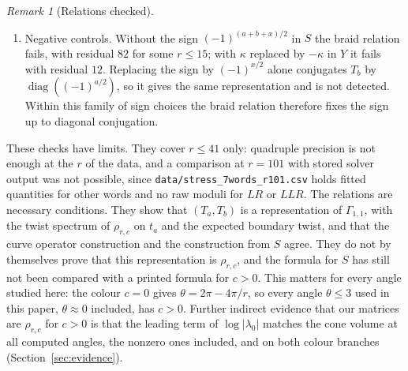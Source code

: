 \documentclass[11pt]{amsart}
\theoremstyle{definition}
\theoremstyle{remark}
\newtheorem{remark}[conjecture]{Remark}
\begin{document}
\begin{remark}[Relations checked]
\begin{enumerate}
\[\]
with principal square roots.
\item Negative controls. Without the sign $(-1)^{(a+b+x)/2}$ in $S$ the braid
relation fails, with residual $82$ for some $r \le 15$; with $\kappa$ replaced by
$-\kappa$ in $Y$ it fails with residual $12$. Replacing the sign by $(-1)^{x/2}$
alone conjugates $T_b$ by $\operatorname{diag}((-1)^{a/2})$, so it gives the same
representation and is not detected. Within this family of sign choices the braid
relation therefore fixes the sign up to diagonal conjugation.
\end{enumerate}
These checks have limits. They cover $r \le 41$ only: quadruple precision is not
enough at the $r$ of the data, and a comparison at $r = 101$ with stored solver
output was not possible, since \texttt{data/stress\_7words\_r101.csv} holds fitted
quantities for other words and no raw moduli for $LR$ or $LLR$. The relations are
necessary conditions. They show that $(T_a, T_b)$ is a representation of
$\Gamma_{1,1}$, with the twist spectrum of $\rho_{r,c}$ on $t_a$ and the expected
boundary twist, and that the curve operator construction and the construction from
$S$ agree. They do not by themselves prove that this representation is
$\rho_{r,c}$, and the formula for $S$ has still not been compared with a printed
formula for $c > 0$. This matters for every angle studied here: the colour $c = 0$
gives $\theta = 2\pi - 4\pi/r$, so every angle $\theta \le 3$ used in this paper,
$\theta \approx 0$ included, has $c > 0$. Further indirect evidence that our
matrices are $\rho_{r,c}$ for $c > 0$ is that the leading term of $\log|\lambda_0|$
matches the cone volume at all computed angles, the nonzero ones included, and on
both colour branches (Section~\ref{sec:evidence}).
\end{remark}
\end{document}
